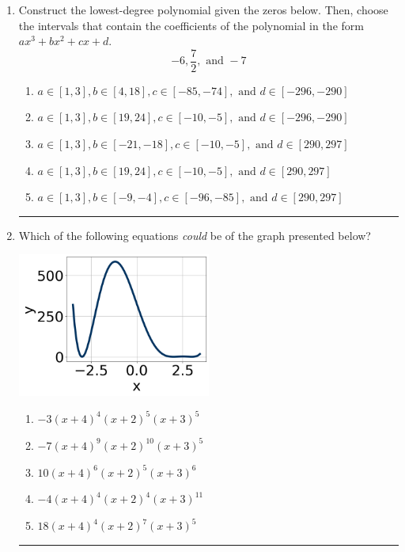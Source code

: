\documentclass[14pt]{extbook}
\newcommand{\litem}[1]{\item#1\hspace*{-1cm}\rule{\textwidth}{0.4pt}}
\begin{document}
\begin{enumerate}
\litem{
Construct the lowest-degree polynomial given the zeros below. Then, choose the intervals that contain the coefficients of the polynomial in the form $ax^3+bx^2+cx+d$.\[ -6, \frac{7}{2}, \text{ and } -7 \]\begin{enumerate}[label=\Alph*.]
\item \( a \in [1, 3], b \in [4, 18], c \in [-85, -74], \text{ and } d \in [-296, -290] \)
\item \( a \in [1, 3], b \in [19, 24], c \in [-10, -5], \text{ and } d \in [-296, -290] \)
\item \( a \in [1, 3], b \in [-21, -18], c \in [-10, -5], \text{ and } d \in [290, 297] \)
\item \( a \in [1, 3], b \in [19, 24], c \in [-10, -5], \text{ and } d \in [290, 297] \)
\item \( a \in [1, 3], b \in [-9, -4], c \in [-96, -85], \text{ and } d \in [290, 297] \)

\end{enumerate} }
\litem{
Which of the following equations \textit{could} be of the graph presented below?
\begin{center}
    \includegraphics[width=0.5\textwidth]{../Figures/polyGraphToFunctionB.png}
\end{center}
\begin{enumerate}[label=\Alph*.]
\item \( -3(x + 4)^{4} (x + 2)^{5} (x + 3)^{5} \)
\item \( -7(x + 4)^{9} (x + 2)^{10} (x + 3)^{5} \)
\item \( 10(x + 4)^{6} (x + 2)^{5} (x + 3)^{6} \)
\item \( -4(x + 4)^{4} (x + 2)^{4} (x + 3)^{11} \)
\item \( 18(x + 4)^{4} (x + 2)^{7} (x + 3)^{5} \)


\end{enumerate}}
\end{enumerate}
\end{document}
